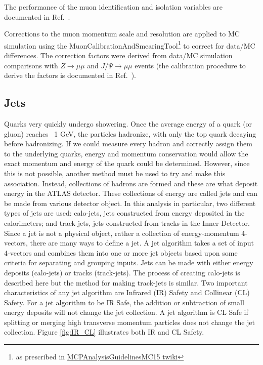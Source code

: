 The performance of the muon identification and isolation variables are documented in Ref.~\cite{Aad:2016jkr}.

Corrections to the muon momentum scale and resolution are applied to MC simulation using the MuonCalibrationAndSmearingTool\footnote{as prescribed 
in \href{https://twiki.cern.ch/twiki/bin/view/AtlasProtected/MCPAnalysisGuidelinesMC15\#Muon_momentum_scale_and_resoluti} {MCPAnalysisGuidelinesMC15 twiki}} 
to correct for  data/MC differences. The correction factors were derived from data/MC 
simulation comparisons with $Z\to \mu \mu$ and $J/\Psi \to \mu \mu$ events (the calibration procedure to derive the factors 
is documented in Ref.~\cite{Aad:2016jkr}).
\subsection{Jets}
Quarks very quickly undergo showering. Once the average energy of a quark (or gluon) reaches ~1 GeV, the particles hadronize, with only the top quark decaying before hadronizing. If we could measure every hadron and correctly assign them to the underlying quarks, energy and momentum conservation would allow the exact momentum and energy of the quark could be determined. However, since this is not possible, another method must be used to try and make this association. Instead, collections of hadrons are formed and these are what deposit energy in the ATLAS detector. These collections of energy are called jets and can be made from various detector object. In this analysis in particular, two different types of jets are used: calo-jets, jets constructed from energy deposited in the calorimeters; and track-jets, jets constructed from tracks in the Inner Detector. \newline
\indent Since a jet is not a physical object, rather a collection of energy-momentum 4-vectors, there are many ways to define a jet. A jet algorithm takes a set of input 4-vectors and combines them into one or more jet objects based upon some criteria for separating and grouping inputs. Jets can be made with either energy deposits (calo-jets) or tracks (track-jets). The process of creating calo-jets is described here but the method for making track-jets is similar.  Two important characteristics of any jet algorithm are Infrared (IR) Safety and Collinear (CL) Safety. For a jet algorithm to be IR Safe, the addition or subtraction of small energy deposits will not change the jet collection. A jet algorithm is CL Safe if splitting or merging high transverse momentum particles does not change the jet collection. Figure \ref{fig:IR_CL} illustrates both IR and CL Safety.


